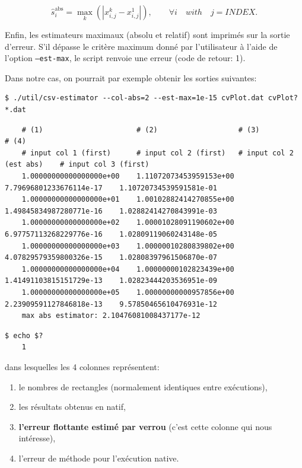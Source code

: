 \documentclass[a4paper]{article}
\newenvironment{commandline}{
  \begin{mdframed}[style=commandline]
}{
  \end{mdframed}
}
\begin{document}
\begin{equation*}
  \hat{s}^{\text{abs}}_{i} = \max_k ( \left|x_{i,j}^k
  -x_{i,j}^1\right| ) , \qquad \forall i   \quad with \quad j=INDEX.
\end{equation*}


Enfin, les estimateurs maximaux (absolu et relatif) sont  imprimés sur la sortie d'erreur. S'il
dépasse le critère maximum donné par l'utilisateur à l'aide de l'option
\texttt{--est-max}, le script renvoie une erreur (code de retour: 1).

\bigskip

Dans notre cas, on pourrait par exemple obtenir les sorties suivantes:
\begin{commandline}
\begin{verbatim}
$ ./util/csv-estimator --col-abs=2 --est-max=1e-15 cvPlot.dat cvPlot?*.dat
\end{verbatim}
{\footnotesize
\begin{verbatim}
    # (1)                      # (2)                   # (3)                      # (4)                   
    # input col 1 (first)      # input col 2 (first)   # input col 2 (est abs)    # input col 3 (first)     
    1.00000000000000000e+00    1.11072073453959153e+00 7.79696801233676114e-17    1.10720734539591581e-01 
    1.00000000000000000e+01    1.00102882414270855e+00 1.49845834987280771e-16    1.02882414270843991e-03 
    1.00000000000000000e+02    1.00001028091190602e+00 6.97757113268229776e-16    1.02809119060243148e-05 
    1.00000000000000000e+03    1.00000010280839802e+00 4.07829579359800326e-15    1.02808397961506870e-07 
    1.00000000000000000e+04    1.00000000102823439e+00 1.41491103815151729e-13    1.02823444203536951e-09 
    1.00000000000000000e+05    1.00000000000957856e+00 2.23909591127846818e-13    9.57850465610476931e-12 
    max abs estimator: 2.10476081008437177e-12
\end{verbatim}
}
\begin{verbatim}
$ echo $?
    1
\end{verbatim}
\end{commandline}
\noindent dans lesquelles les 4 colonnes représentent:
\begin{enumerate}
\item le nombres de rectangles (normalement identiques entre exécutions),
\item les résultats obtenus en natif,
\item {\bf l'erreur flottante estimé par verrou} (c'est cette colonne qui
  nous intéresse),
\item l'erreur de méthode pour l'exécution native.
\end{enumerate}
\end{document}
